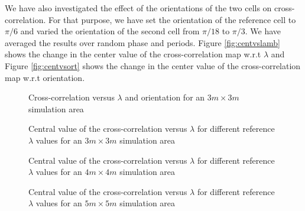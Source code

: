 \documentclass[11pt, letterpaper, onecolumn]{article}
\begin{document}
We have also investigated the effect of the orientations of the two cells on cross-correlation. For that purpose, we have set the orientation of the reference cell to $ \pi/6 $ and varied the orientation of the second cell from $ \pi/18 $ to $ \pi/3 $. We have averaged the results over random phase and periods. Figure \ref{fig:centvslamb} shows the change in the center value of the cross-correlation map w.r.t $ \lambda $ and Figure \ref{fig:centvsort} shows the change in the center value of the cross-correlation map w.r.t orientation.

\begin{figure}[H]
\centering
{}
\caption{Cross-correlation versus $ \lambda $ and orientation for an $ 3m \times 3m $ simulation area}
\end{figure}


\begin{figure}[H]
\centering
{}
\caption{Central value of the cross-correlation versus $ \lambda $ for different reference $ \lambda $ values for an $ 3m \times 3m $ simulation area}
 \label{fig:normcross2}
\end{figure}

\begin{figure}[H]
\centering
{}
\caption{Central value of the cross-correlation versus $ \lambda $ for different reference $ \lambda $ values for an $ 4m \times 4m $ simulation area}
\end{figure}

\begin{figure}[H]
\centering
{}
\caption{Central value of the cross-correlation versus $ \lambda $ for different reference $ \lambda $ values for an $ 5m \times 5m $ simulation area}
\end{figure}
\end{document}
